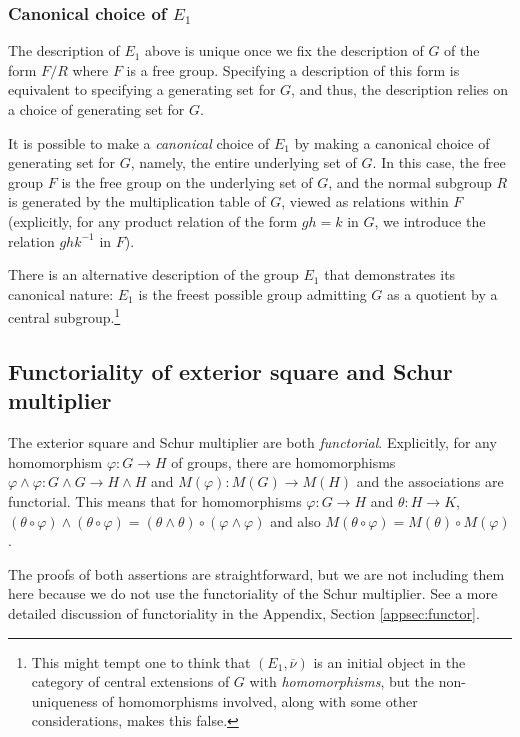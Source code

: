 \subsubsection{Canonical choice of $E_1$}

The description of $E_1$ above is unique once we fix the description
of $G$ of the form $F/R$ where $F$ is a free group. Specifying a
description of this form is equivalent to specifying a generating set
for $G$, and thus, the description relies on a choice of generating
set for $G$.

It is possible to make a {\em canonical} choice of $E_1$ by making a
canonical choice of generating set for $G$, namely, the entire
underlying set of $G$. In this case, the free group $F$ is the free
group on the underlying set of $G$, and the normal subgroup $R$ is
generated by the multiplication table of $G$, viewed as relations
within $F$ (explicitly, for any product relation of the form $gh = k$
in $G$, we introduce the relation $ghk^{-1}$ in $F$).

There is an alternative description of the group $E_1$ that
demonstrates its canonical nature: $E_1$ is the freest possible group
admitting $G$ as a quotient by a central subgroup.\footnote{This might
  tempt one to think that $(E_1,\overline{\nu})$ is an initial object
  in the category of central extensions of $G$ with {\em
    homomorphisms}, but the non-uniqueness of homomorphisms involved,
  along with some other considerations, makes this false.}

\subsection{Functoriality of exterior square and Schur multiplier}\label{sec:functoriality}

The exterior square and Schur multiplier are both {\em
  functorial}. Explicitly, for any homomorphism $\varphi:G \to H$ of
groups, there are homomorphisms $\varphi \wedge \varphi: G \wedge G
\to H \wedge H$ and $M(\varphi): M(G) \to M(H)$ and the associations
are functorial. This means that for homomorphisms $\varphi:G \to H$
and $\theta: H \to K$, $(\theta \circ \varphi) \wedge (\theta \circ
\varphi) = (\theta \wedge \theta) \circ (\varphi \wedge \varphi)$ and
also $M(\theta \circ \varphi) = M(\theta) \circ M(\varphi)$.

The proofs of both assertions are straightforward, but we are not
including them here because we do not use the functoriality of the
Schur multiplier. See a more detailed discussion of functoriality in
the Appendix, Section \ref{appsec:functor}.

